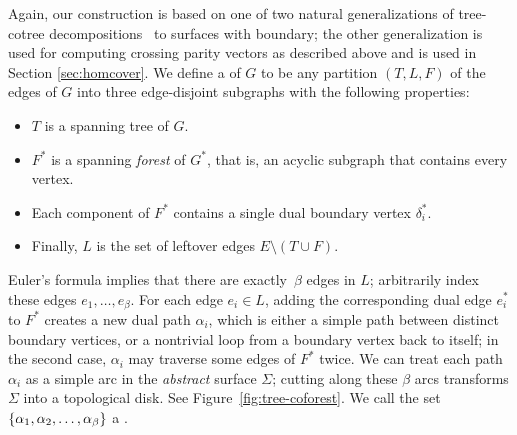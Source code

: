 \documentclass[11pt,twoside]{article}
\def\dualarc{\alpha}
\begin{document}
Again, our construction is based on one of two natural generalizations of tree-cotree decompositions~\cite{e-dgteg-03} to surfaces with boundary; the other generalization is used for computing crossing parity vectors as described above and is used in Section \ref{sec:homcover}.
We define a  of $G$ to be any partition $(T, L, F)$ of the edges of $G$ into three edge-disjoint subgraphs with the following properties:
\begin{itemize}\itemsep0pt
\item $T$ is a spanning tree of $G$.
\item $F^*$ is a spanning \emph{forest} of $G^*$, that is, an acyclic subgraph that contains every vertex.
\item Each component of $F^*$ contains a single dual boundary vertex $\delta_i^*$.
\item Finally, $L$ is the set of leftover edges $E \setminus (T\cup F)$.
\end{itemize}
%
Euler's formula implies that there are exactly~$\beta$ edges in $L$; arbitrarily index these edges $e_1, \dots, e_\beta$.  For each edge $e_i\in L$, adding the corresponding dual edge $e_i^*$ to $F^*$ creates a new dual path $\dualarc_i$, which is either a simple path between distinct boundary vertices, or a nontrivial loop from a boundary vertex back to itself; in the second case, $\dualarc_i$ may traverse some edges of $F^*$ twice.  We can treat each path $\dualarc_i$ as a simple arc in the \emph{abstract} surface $\Sigma$; cutting along these $\beta$ arcs transforms $\Sigma$ into a topological disk.
See Figure~\ref{fig:tree-coforest}.  We call the set $\set{\dualarc_1, \dualarc_2, \dots, \dualarc_\beta}$ a .
\end{document}
